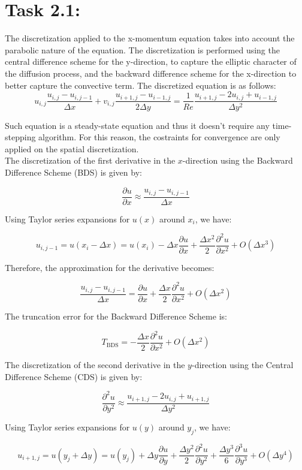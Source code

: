 \documentclass{article}
\begin{document}
\section*{\Large Task 2.1:}
The discretization applied to the x-momentum equation takes into account the parabolic nature of the equation. The discretization is performed using the central difference scheme for the y-direction, to capture the elliptic character of the diffusion process, and the backward difference scheme for the x-direction to better capture the convective term. The discretized equation is as follows:
\[
  u_{i,j}\frac{u_{i,j} - u_{i,j-1}}{\Delta x}  + v_{i,j} \frac{u_{i+1,j} - u_{i-1,j}}{2 \Delta y} = \frac{1}{Re} \frac{u_{i+1,j} - 2u_{i,j} + u_{i-1,j}}{\Delta y^2}
\]

Such equation is a steady-state equation and thus it doesn't require any time-stepping algorithm. 
For this reason, the costraints for convergence are only applied on the spatial discretization.
\\
The discretization of the first derivative in the \(x\)-direction using the Backward Difference Scheme (BDS) is given by:

\[
\frac{\partial u}{\partial x} \approx \frac{u_{i,j} - u_{i,j-1}}{\Delta x}
\]

Using Taylor series expansions for \( u(x) \) around \( x_i \), we have:

\[
u_{i,j-1} = u(x_i - \Delta x) = u(x_i) - \Delta x \frac{\partial u}{\partial x} + \frac{\Delta x^2}{2} \frac{\partial^2 u}{\partial x^2} + O(\Delta x^3)
\]

Therefore, the approximation for the derivative becomes:

\[
\frac{u_{i,j} - u_{i,j-1}}{\Delta x} = \frac{\partial u}{\partial x} + \frac{\Delta x}{2} \frac{\partial^2 u}{\partial x^2} + O(\Delta x^2)
\]

The truncation error for the Backward Difference Scheme is:

\[
T_{\text{BDS}} = -\frac{\Delta x}{2} \frac{\partial^2 u}{\partial x^2} + O(\Delta x^2)
\]

The discretization of the second derivative in the \(y\)-direction using the Central Difference Scheme (CDS) is given by:

\[
\frac{\partial^2 u}{\partial y^2} \approx \frac{u_{i+1,j} - 2u_{i,j} + u_{i+1,j}}{\Delta y^2}
\]

Using Taylor series expansions for \( u(y) \) around \( y_j \), we have:

\[
u_{i+1,j} = u(y_j + \Delta y) = u(y_j) + \Delta y \frac{\partial u}{\partial y} + \frac{\Delta y^2}{2} \frac{\partial^2 u}{\partial y^2} + \frac{\Delta y^3}{6} \frac{\partial^3 u}{\partial y^3} + O(\Delta y^4)
\]
\end{document}
